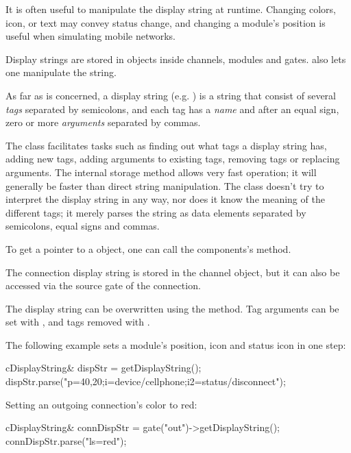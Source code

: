 It is often useful to manipulate the display string at runtime.
Changing colors, icon, or text may convey status change, and
changing a module's position is useful when simulating mobile
networks.

Display strings are stored in  objects inside
channels, modules and gates.  also lets one
manipulate the string.

As far as  is concerned, a display string
(e.g. ) is a string that consist of several
\textit{tags} separated by semicolons, and each tag has a \textit{name}
and after an equal sign, zero or more \textit{arguments} separated by commas.

The class facilitates tasks such as finding out what tags a display string
has, adding new tags, adding arguments to existing tags, removing tags or
replacing arguments. The internal storage method allows very fast
operation; it will generally be faster than direct string manipulation. The
class doesn't try to interpret the display string in any way, nor does it
know the meaning of the different tags; it merely parses the string as data
elements separated by semicolons, equal signs and commas.

To get a pointer to a  object, one can call
the components's  method.

\begin{note}
The connection display string is stored in the channel object, but it
can also be accessed via the source gate of the connection.
\end{note}

The display string can be overwritten using the  method.
Tag arguments can be set with , and tags removed
with .

The following example sets a module's position, icon and status icon
in one step:

\begin{cpp}
cDisplayString& dispStr = getDisplayString();
dispStr.parse("p=40,20;i=device/cellphone;i2=status/disconnect");
\end{cpp}

Setting an outgoing connection's color to red:

\begin{cpp}
cDisplayString& connDispStr = gate("out")->getDisplayString();
connDispStr.parse("ls=red");
\end{cpp}

